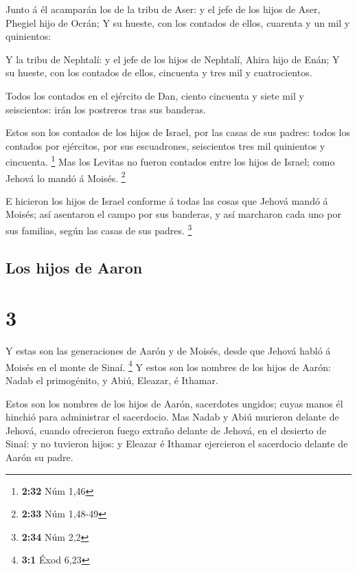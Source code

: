  Junto á él acamparán los de la tribu de Aser: y el jefe
de los hijos de Aser, Phegiel hijo de Ocrán;  Y su
hueste, con los contados de ellos, cuarenta y un mil y quinientos:

 Y la tribu de Nephtalí: y el jefe de los hijos de
Nephtalí, Ahira hijo de Enán;  Y su hueste, con los
contados de ellos, cincuenta y tres mil y cuatrocientos.

 Todos los contados en el ejército de Dan, ciento
cincuenta y siete mil y seiscientos: irán los postreros tras sus
banderas.

 Estos son los contados de los hijos de Israel, por las
casas de sus padres: todos los contados por ejércitos, por sus
escuadrones, seiscientos tres mil quinientos y cincuenta. \footnote{\textbf{2:32}
  Núm 1,46}  Mas los Levitas no fueron contados entre los
hijos de Israel; como Jehová lo mandó á Moisés. \footnote{\textbf{2:33}
  Núm 1,48-49}

 E hicieron los hijos de Israel conforme á todas las
cosas que Jehová mandó á Moisés; así asentaron el campo por sus
banderas, y así marcharon cada uno por sus familias, según las casas de
sus padres. \footnote{\textbf{2:34} Núm 2,2}

\hypertarget{los-hijos-de-aaron}{%
\subsection{Los hijos de Aaron}\label{los-hijos-de-aaron}}

\hypertarget{section-2}{%
\section{3}\label{section-2}}

 Y estas son las generaciones de Aarón y de Moisés, desde
que Jehová habló á Moisés en el monte de Sinaí. \footnote{\textbf{3:1}
  Éxod 6,23}  Y estos son los nombres de los hijos de
Aarón: Nadab el primogénito, y Abiú, Eleazar, é Ithamar.

 Estos son los nombres de los hijos de Aarón, sacerdotes
ungidos; cuyas manos él hinchió para administrar el sacerdocio.
 Mas Nadab y Abiú murieron delante de Jehová, cuando
ofrecieron fuego extraño delante de Jehová, en el desierto de Sinaí: y
no tuvieron hijos: y Eleazar é Ithamar ejercieron el sacerdocio delante
de Aarón su padre.


